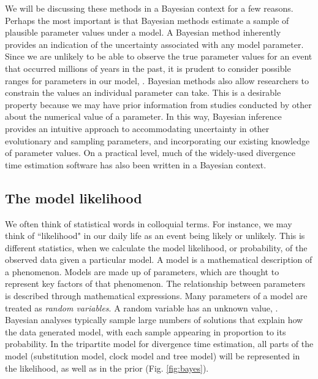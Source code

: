 We will be discussing these methods in a Bayesian context for a few reasons.
Perhaps the most important is that Bayesian methods estimate a sample of plausible parameter values under a model.
A Bayesian method inherently provides an indication of the uncertainty associated with any model parameter.
Since we are unlikely to be able to observe the true parameter values for an event that occurred millions of years in the past, it is prudent to consider possible ranges for parameters in our model, .
Bayesian methods also allow researchers to constrain the values an individual parameter can take.
This is a desirable property because we may have prior information from studies conducted by other  about the numerical value of a parameter.
In this way, Bayesian inference provides an intuitive approach to accommodating uncertainty in other evolutionary and sampling parameters, and incorporating our existing knowledge of parameter values.
On a practical level, much of the widely-used divergence time estimation software has also been written in a Bayesian context.


\subsection{The model likelihood}

We often think of statistical words in colloquial terms.
For instance, we may think of ``likelihood" in our daily life as an event being likely or unlikely.
This is different  statistics, when we calculate the model likelihood, or probability, of the observed data given a particular model.
A model is a mathematical description of a phenomenon.
Models are made up of parameters, which are thought to represent key factors of that phenomenon.
The relationship between parameters is described through mathematical expressions.
Many parameters of a model are treated as \textit{random variables}.
A random variable has an unknown value, .
Bayesian analyses typically sample large numbers of solutions that explain how the data  generated  model, with each sample appearing in proportion to its probability.
In the tripartite model for divergence time estimation, all parts of the model (substitution model, clock model and tree model) will be represented in the likelihood, as well as in the prior (Fig. \ref{fig:bayes}).

